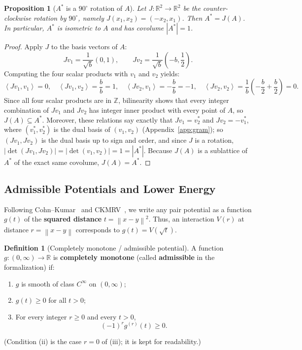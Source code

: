 \documentclass[11pt, a4paper]{article}
\newtheorem{proposition}[theorem]{Proposition}
\theoremstyle{definition}
\newtheorem{definition}[theorem]{Definition}
\theoremstyle{remark}
\newcommand{\R}{\mathbb{R}}
\newcommand{\Z}{\mathbb{Z}}
\newcommand{\norm}[1]{\left\lVert #1 \right\rVert}
\newcommand{\abs}[1]{\left\lvert #1 \right\rvert}
\newcommand{\inner}[2]{\left\langle #1, #2 \right\rangle}
\begin{document}
\begin{proposition}[$A^*$ is a $90^\circ$ rotation of $A$]
\label{prop:dual_A}
Let $J : \R^2 \to \R^2$ be the counter-clockwise rotation by $90^\circ$, namely $J(x_1, x_2) = (-x_2, x_1)$. Then $A^* = J(A)$. In particular, $A^*$ is isometric to $A$ and has covolume $\abs{A^*} = 1$.
\end{proposition}

\begin{proof}
Apply $J$ to the basis vectors of $A$:
\[
J v_1 = \frac{1}{\sqrt{b}}(0, 1), \qquad J v_2 = \frac{1}{\sqrt{b}}\left(-b, \frac{1}{2}\right).
\]
Computing the four scalar products with $v_1$ and $v_2$ yields:
\[
\inner{J v_1}{v_1} = 0, \quad \inner{J v_1}{v_2} = \frac{b}{b} = 1, \quad \inner{J v_2}{v_1} = -\frac{b}{b} = -1, \quad \inner{J v_2}{v_2} = \frac{1}{b}\left(-\frac{b}{2} + \frac{b}{2}\right) = 0.
\]
Since all four scalar products are in $\Z$, bilinearity shows that every integer combination of $J v_1$ and $J v_2$ has integer inner product with every point of $A$, so $J(A) \subseteq A^*$. Moreover, these relations say exactly that $J v_1 = v_2^*$ and $J v_2 = -v_1^*$, where $(v_1^*, v_2^*)$ is the dual basis of $(v_1, v_2)$ (Appendix~\ref{app:gram}); so $(J v_1, J v_2)$ is the dual basis up to sign and order, and since $J$ is a rotation, $\abs{\det(J v_1, J v_2)} = \abs{\det(v_1, v_2)} = 1 = \abs{A^*}$. Because $J(A)$ is a sublattice of $A^*$ of the exact same covolume, $J(A) = A^*$.
\end{proof}

\subsection{Admissible Potentials and Lower Energy}

Following Cohn--Kumar~\cite{CK07} and CKMRV~\cite{CKMRV22}, we write any pair potential as a function $g(t)$ of the \textbf{squared distance} $t = \norm{x - y}^2$. Thus, an interaction $V(r)$ at distance $r = \norm{x - y}$ corresponds to $g(t) = V(\sqrt{t})$.

\begin{definition}[Completely monotone / admissible potential]
\label{def:admissible}
A function $g : (0, \infty) \to \R$ is \textbf{completely monotone} (called \textbf{admissible} in the formalization) if:
\begin{enumerate}[label=(\roman*)]
    \item $g$ is smooth of class $C^\infty$ on $(0, \infty)$;
    \item $g(t) \ge 0$ for all $t > 0$;
    \item For every integer $r \ge 0$ and every $t > 0$,
    \[
    (-1)^r g^{(r)}(t) \ge 0.
    \]
\end{enumerate}
(Condition (ii) is the case $r = 0$ of (iii); it is kept for readability.)
\end{definition}
\end{document}

